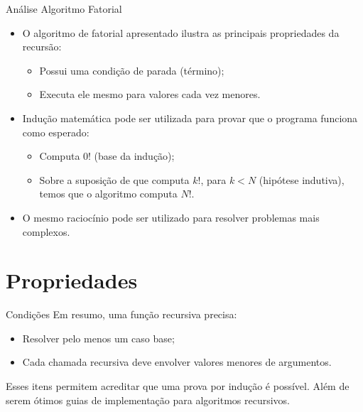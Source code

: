 \documentclass{beamer}
\begin{document}
	\begin{frame}[c]{Análise Algoritmo Fatorial}
		\begin{itemize}
			\item O algoritmo de fatorial apresentado ilustra as principais propriedades da recursão:
			\begin{itemize}
				\item Possui uma condição de parada (término);
				\item Executa ele mesmo para valores cada vez menores.
			\end{itemize}

			\item Indução matemática pode ser utilizada para provar que o programa funciona como esperado:

			\begin{itemize}
				\item Computa 0! (base da indução);
				\item Sobre a suposição de que computa $k!$, para $k < N$ (hipótese indutiva), temos que o algoritmo computa $N!$.
			\end{itemize}
			\item O mesmo raciocínio pode ser utilizado para resolver problemas mais complexos.
		\end{itemize}
	\end{frame}

	\section{Propriedades}

	\begin{frame}[c]{Condições}
		Em resumo, uma função recursiva precisa:
		\begin{itemize}
			\item Resolver pelo menos um caso base;
			\item Cada chamada recursiva deve envolver valores menores de argumentos.
		\end{itemize}

		Esses itens permitem acreditar que uma prova por indução é possível. Além de serem ótimos guias de implementação para algoritmos recursivos.
	\end{frame}
\end{document}

